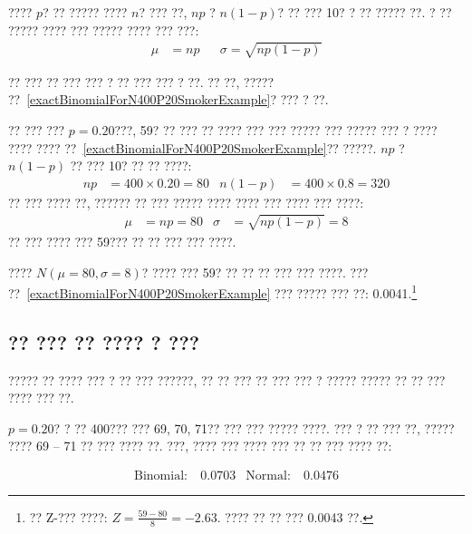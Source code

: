 \begin{termBox}{
???? $p$? ?? ????? ???? $n$? ??? ??, $np$ ? $n(1-p)$? ?? ??? 10? ? ?? ????? ??. ? ?? ????? ???? ??? ????? ???? ??? ???: \vspace{-1.5mm}
\begin{align*}
\mu &= np
&&\sigma= \sqrt{np(1-p)}
\end{align*}}
\end{termBox}

?? ??? ?? ??? ??? ? ?? ??? ??? ? ??. ?? ??, ????? ??~\ref{exactBinomialForN400P20SmokerExample}? ??? ? ??.

\begin{example}{
?? ??? ??? $p=0.20$???, 59? ?? ??? ?? ???? ??? ??? ????? ??? ????? ??? ? ????} \label{approxBinomialForN400P20SmokerExample}
???? ???? ??~\ref{exactBinomialForN400P20SmokerExample}?? ?????. $np$ ? $n(1-p)$ ?? ??? 10? ?? ?? ????:
\begin{align*}
np&=400\times 0.20=80
&n(1-p)&=400\times 0.8=320
\end{align*}
?? ??? ???? ??, ?????? ?? ??? ????? ???? ???? ??? ???? ??? ????:
\begin{align*}
\mu &= np = 80
&\sigma &= \sqrt{np(1-p)} = 8
\end{align*}
?? ??? ???? ??? 59??? ?? ?? ??? ??? ????.
\end{example}

\begin{exercise}
???? $N(\mu=80, \sigma=8)$? ???? ??? 59? ?? ?? ?? ??? ??? ????. ??? ??~\ref{exactBinomialForN400P20SmokerExample} ??? ????? ??? ??: 0.0041.\footnote{
?? Z-??? ????: $Z=\frac{59 - 80}{8} = -2.63$. ???? ?? ?? ??? 0.0043 ??.}
\end{exercise}


\subsection{?? ??? ?? ???? ? ???}

\begin{caution}
{????? ?? ???? ??? ? ??}
{??? ??????, ?? ?? ??? ?? ??? ??? ? ????? ????? ?? ?? ??? ???? ??? ??.}
\end{caution}

$p=0.20$? ? ?? 400??? ??? 69, 70, 71?? ??? ??? ????? ????. ??? ? ?? ??? ??, ????? ???? 69 -- 71 ?? ??? ???? ??. ???, ???? ??? ???? ??? ?? ?? ??? ???? ??:

\begin{align*}
\text{Binomial:}&\ 0.0703
&\text{Normal:}&\ 0.0476
\end{align*}


